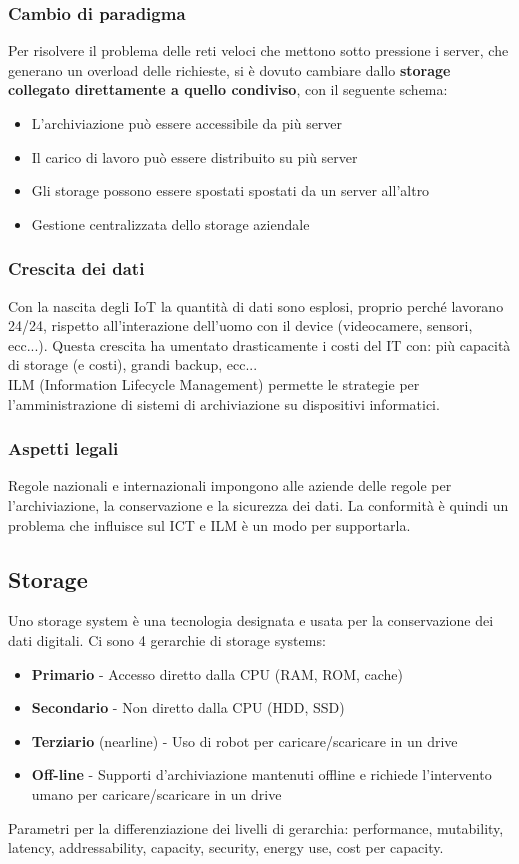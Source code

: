 \documentclass[8pt,a4paper]{article}
\begin{document}
\begin{multicols*}{4}
		\subsubsection{Cambio di paradigma}
		Per risolvere il problema delle reti veloci che mettono sotto pressione i server, che generano un overload delle richieste, si è dovuto cambiare dallo \textbf{storage collegato direttamente a quello condiviso}, con il seguente schema:
		\begin{itemize}
			\item L'archiviazione può essere accessibile da più server
			\item Il carico di lavoro può essere distribuito su più server
			\item Gli storage possono essere spostati spostati da un server all'altro
			\item Gestione centralizzata dello storage aziendale 
		\end{itemize}
		
		\subsubsection{Crescita dei dati}
		Con la nascita degli IoT la quantità di dati sono esplosi, proprio perché lavorano 24/24, rispetto all'interazione dell'uomo con il device (videocamere, sensori, ecc...). Questa crescita ha umentato drasticamente i costi del IT con: più capacità di storage (e costi), grandi backup, ecc... \\ ILM (Information Lifecycle Management) permette le strategie per l'amministrazione di sistemi di archiviazione su dispositivi informatici.
		\subsubsection{Aspetti legali}
	 	Regole nazionali e internazionali impongono alle aziende delle regole per l'archiviazione, la conservazione e la sicurezza dei dati. La conformità è quindi un problema che influisce sul ICT e ILM è un modo per supportarla.
	 	
	 	\subsection{Storage}
	 	Uno storage system è una tecnologia designata e usata per la conservazione dei dati digitali. Ci sono 4 gerarchie di storage systems:
	 	\begin{itemize}
	 		\item \textbf{Primario} - Accesso diretto dalla CPU (RAM, ROM, cache)
	 		\item \textbf{Secondario} - Non diretto dalla CPU (HDD, SSD)
	 		\item \textbf{Terziario} (nearline) - Uso di robot per caricare/scaricare in un drive
	 		\item \textbf{Off-line} - Supporti d'archiviazione mantenuti offline e richiede l'intervento umano per caricare/scaricare in un drive
	 	\end{itemize}
	 	Parametri per la differenziazione dei livelli di gerarchia: performance, mutability, latency, addressability, capacity, security, energy use, cost per capacity.

\end{multicols*}
\end{document}
